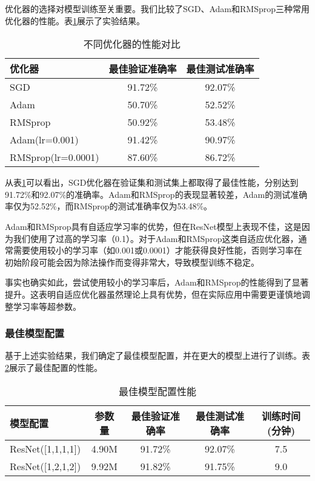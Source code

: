 \documentclass[12pt,a4paper]{article}
\begin{document}
优化器的选择对模型训练至关重要。我们比较了SGD、Adam和RMSprop三种常用优化器的性能。表\ref{tab:optimizers}展示了实验结果。

\begin{table}[htbp]
\centering
\caption{不同优化器的性能对比}
\label{tab:optimizers}
\begin{tabular}{lcc}
\toprule
\textbf{优化器} & \textbf{最佳验证准确率} & \textbf{最佳测试准确率} \\
\midrule
SGD & 91.72\% & 92.07\% \\
Adam & 50.70\% & 52.52\% \\
RMSprop & 50.92\% & 53.48\% \\
Adam(lr=0.001) & 91.42\% & 90.97\% \\
RMSprop(lr=0.0001) & 87.60\% & 86.72\% \\
\bottomrule
\end{tabular}
\end{table}

从表\ref{tab:optimizers}可以看出，SGD优化器在验证集和测试集上都取得了最佳性能，分别达到91.72\%和92.07\%的准确率。Adam和RMSprop的表现显著较差，Adam的测试准确率仅为52.52\%，而RMSprop的测试准确率仅为53.48\%。

Adam和RMSprop具有自适应学习率的优势，但在ResNet模型上表现不佳，这是因为我们使用了过高的学习率（0.1）。对于Adam和RMSprop这类自适应优化器，通常需要使用较小的学习率（如0.001或0.0001）才能获得良好性能，否则学习率在初始阶段可能会因为除法操作而变得非常大，导致模型训练不稳定。

事实也确实如此，尝试使用较小的学习率后，Adam和RMSprop的性能得到了显著提升。这表明自适应优化器虽然理论上具有优势，但在实际应用中需要更谨慎地调整学习率等超参数。

\subsubsection{最佳模型配置}

基于上述实验结果，我们确定了最佳模型配置，并在更大的模型上进行了训练。表\ref{tab:best_model}展示了最佳配置的性能。

\begin{table}[htbp]
\centering
\caption{最佳模型配置性能}
\label{tab:best_model}
\begin{tabular}{lcccc}
\toprule
\textbf{模型配置} & \textbf{参数量} & \textbf{最佳验证准确率} & \textbf{最佳测试准确率} & \textbf{训练时间(分钟)} \\
\midrule
ResNet([1,1,1,1]) & 4.90M & 91.72\% & 92.07\% & 7.5 \\
ResNet([1,2,1,2]) & 9.92M & 91.82\% & 91.75\% & 9.0 \\
\bottomrule
\end{tabular}
\end{table}
\end{document}
